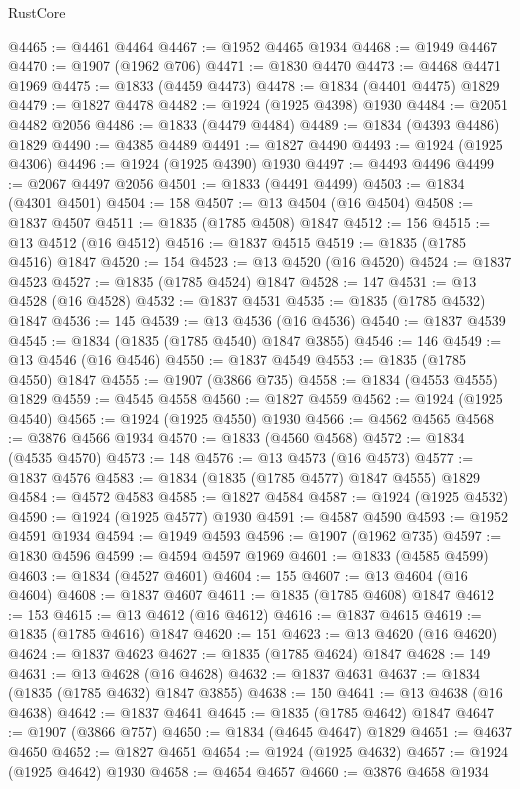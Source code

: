 \begin{lexlean}{RustCore}
\begin{coremodule}
@4465 := @4461 @4464
@4467 := @1952 @4465 @1934
@4468 := @1949 @4467
@4470 := @1907 (@1962 @706)
@4471 := @1830 @4470
@4473 := @4468 @4471 @1969
@4475 := @1833 (@4459 @4473)
@4478 := @1834 (@4401 @4475) @1829
@4479 := @1827 @4478
@4482 := @1924 (@1925 @4398) @1930
@4484 := @2051 @4482 @2056
@4486 := @1833 (@4479 @4484)
@4489 := @1834 (@4393 @4486) @1829
@4490 := @4385 @4489
@4491 := @1827 @4490
@4493 := @1924 (@1925 @4306)
@4496 := @1924 (@1925 @4390) @1930
@4497 := @4493 @4496
@4499 := @2067 @4497 @2056
@4501 := @1833 (@4491 @4499)
@4503 := @1834 (@4301 @4501)
@4504 := 158
@4507 := @13 @4504 (@16 @4504)
@4508 := @1837 @4507
@4511 := @1835 (@1785 @4508) @1847
@4512 := 156
@4515 := @13 @4512 (@16 @4512)
@4516 := @1837 @4515
@4519 := @1835 (@1785 @4516) @1847
@4520 := 154
@4523 := @13 @4520 (@16 @4520)
@4524 := @1837 @4523
@4527 := @1835 (@1785 @4524) @1847
@4528 := 147
@4531 := @13 @4528 (@16 @4528)
@4532 := @1837 @4531
@4535 := @1835 (@1785 @4532) @1847
@4536 := 145
@4539 := @13 @4536 (@16 @4536)
@4540 := @1837 @4539
@4545 := @1834 (@1835 (@1785 @4540) @1847 @3855)
@4546 := 146
@4549 := @13 @4546 (@16 @4546)
@4550 := @1837 @4549
@4553 := @1835 (@1785 @4550) @1847
@4555 := @1907 (@3866 @735)
@4558 := @1834 (@4553 @4555) @1829
@4559 := @4545 @4558
@4560 := @1827 @4559
@4562 := @1924 (@1925 @4540)
@4565 := @1924 (@1925 @4550) @1930
@4566 := @4562 @4565
@4568 := @3876 @4566 @1934
@4570 := @1833 (@4560 @4568)
@4572 := @1834 (@4535 @4570)
@4573 := 148
@4576 := @13 @4573 (@16 @4573)
@4577 := @1837 @4576
@4583 := @1834 (@1835 (@1785 @4577) @1847 @4555) @1829
@4584 := @4572 @4583
@4585 := @1827 @4584
@4587 := @1924 (@1925 @4532)
@4590 := @1924 (@1925 @4577) @1930
@4591 := @4587 @4590
@4593 := @1952 @4591 @1934
@4594 := @1949 @4593
@4596 := @1907 (@1962 @735)
@4597 := @1830 @4596
@4599 := @4594 @4597 @1969
@4601 := @1833 (@4585 @4599)
@4603 := @1834 (@4527 @4601)
@4604 := 155
@4607 := @13 @4604 (@16 @4604)
@4608 := @1837 @4607
@4611 := @1835 (@1785 @4608) @1847
@4612 := 153
@4615 := @13 @4612 (@16 @4612)
@4616 := @1837 @4615
@4619 := @1835 (@1785 @4616) @1847
@4620 := 151
@4623 := @13 @4620 (@16 @4620)
@4624 := @1837 @4623
@4627 := @1835 (@1785 @4624) @1847
@4628 := 149
@4631 := @13 @4628 (@16 @4628)
@4632 := @1837 @4631
@4637 := @1834 (@1835 (@1785 @4632) @1847 @3855)
@4638 := 150
@4641 := @13 @4638 (@16 @4638)
@4642 := @1837 @4641
@4645 := @1835 (@1785 @4642) @1847
@4647 := @1907 (@3866 @757)
@4650 := @1834 (@4645 @4647) @1829
@4651 := @4637 @4650
@4652 := @1827 @4651
@4654 := @1924 (@1925 @4632)
@4657 := @1924 (@1925 @4642) @1930
@4658 := @4654 @4657
@4660 := @3876 @4658 @1934

\end{coremodule}
\end{lexlean}

